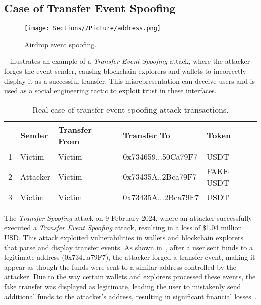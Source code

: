 \subsection{Case of Transfer Event Spoofing}

\begin{figure}
    \centering
    \texttt{[image: Sections//Picture/address.png]}
    \caption{Airdrop event spoofing.}
    \label{fig:airdrop}
\end{figure}

~ illustrates an example of a \emph{Transfer Event Spoofing} attack, where the attacker forges the event sender, causing blockchain explorers and wallets to incorrectly display it as a successful transfer. This misrepresentation can deceive users and is used as a social engineering tactic to exploit trust in these interfaces.


\begin{table}[]
\caption{Real case of transfer event spoofing attack transactions.}
\label{tab:transfer_spoof_attack_transaction}
\begin{tabular}{lllll}
\toprule
  & Sender & Transfer From                & Transfer To                  & Token      \\
\midrule
1 & Victim           & Victim & 0x{\color[HTML]{FE0000}734}659...50C{\color[HTML]{FE0000}a79F7} & USDT \\
\midrule
2 & Attacker              & Victim & 0x{\color[HTML]{FE0000}734}35A..2Bc{\color[HTML]{FE0000}a79F7}  & FAKE USDT     \\
\midrule
3 & Victim           & Victim & 0x{\color[HTML]{FE0000}734}35A...2Bc{\color[HTML]{FE0000}a79F7} & USDT \\
\bottomrule
\end{tabular}
\end{table}
The \emph{Transfer Spoofing} attack on 9 February 2024, where an attacker successfully executed a \emph{Transfer Event Spoofing} attack, resulting in a loss of \$1.04 million USD. This attack exploited vulnerabilities in wallets and blockchain explorers that parse and display transfer events. As shown in~, after a user sent funds to a legitimate address (0x734\ldots{}a79F7), the attacker forged a transfer event, making it appear as though the funds were sent to a similar address controlled by the attacker. Due to the way certain wallets and explorers processed these events, the fake transfer was displayed as legitimate, leading the user to mistakenly send additional funds to the attacker's address, resulting in significant financial losses~\cite{zero_transfer}.